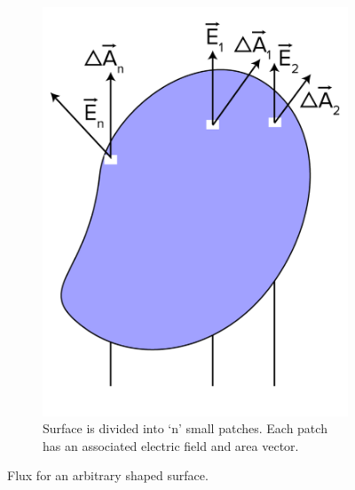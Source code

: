 \begin{figure}[H]
\begin{subfigure}[t]{0.3\textwidth}
      \includegraphics[scale = 0.5]{Images/Chapter-11/11.13b.png}
      \caption{Surface is divided into `n' small patches. Each patch has
      an associated electric field and area vector.}
      \label{fig:11.13(b)}
  \end{subfigure}
  \caption[]{Flux for an arbitrary shaped surface.}
  \label{fig:11.13}
\end{figure}

